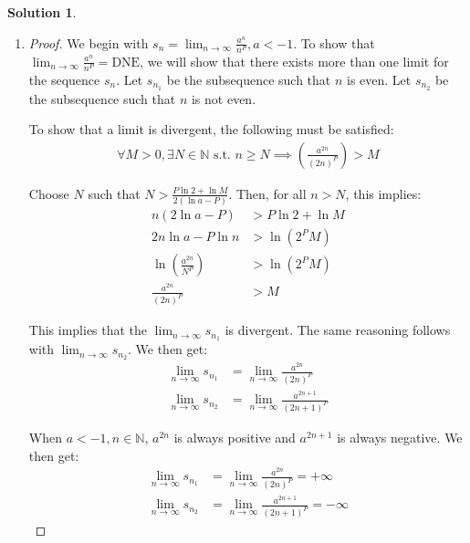 \documentclass[12pt]{article}
\theoremstyle{definition} %
\newtheorem{solution}{Solution}
\theoremstyle{plain} %
\begin{document}
\begin{solution}
\begin{enumerate}
\begin{proof}
        The $\lim_{n \to \infty} \left| \frac{s_{n+1}}{s_n} \right|$ exists, so Problem 1 applies. According to the result from Problem 1a, if $\lim_{n \to \infty} \left| \frac{s_{n+1}}{s_n} \right| > 1$, then $\lim_{n \to \infty} s_n = +\infty$. When $a > 1$, $\lim_{n \to \infty} \frac{a^n}{n^P} = a$. Therefore, its limit must be $+\infty$ when $a > 1$, as desired. $\qed$
    \end{proof}
    \item \begin{proof}
        We begin with $s_n = \lim_{n \to \infty} \frac{a^n}{n^P}, a < -1$. To show that $\lim_{n \to \infty} \frac{a^n}{n^P} = \text{DNE}$, we will show that there exists more than one limit for the sequence $s_n$. Let $s_{n_1}$ be the subsequence such that $n$ is even. Let $s_{n_2}$ be the subsequence such that $n$ is not even. 
    
        To show that a limit is divergent, the following must be satisfied: 
        \begin{align}
        \forall M > 0, \exists N \in \mathbb{N} \text{ s.t. } n \geq N \implies \left( \frac{a^{2n}}{(2n)^P} \right) > M \tag{23}
        \end{align}
    
        Choose $N$ such that $N > \frac{P \ln 2 + \ln M}{2 (\ln a - P)}$. Then, for all $n > N$, this implies:
        \begin{align}
            n(2 \ln a - P) &> P \ln 2 + \ln M \tag{24} \\
            2n \ln a - P \ln n &> \ln (2^P M) \tag{25} \\
            \ln \left( \frac{a^{2n}}{N^P} \right) &> \ln (2^P M) \tag{26} \\
            \frac{a^{2n}}{(2n)^P} &> M \tag{27}
        \end{align}
    
        This implies that the $\lim_{n \to \infty} s_{n_1}$ is divergent. The same reasoning follows with $\lim_{n \to \infty} s_{n_2}$. We then get:
        \begin{align}
            \lim_{n \to \infty} s_{n_1} &= \lim_{n \to \infty} \frac{a^{2n}}{(2n)^P} \tag{28} \\
            \lim_{n \to \infty} s_{n_2} &= \lim_{n \to \infty} \frac{a^{2n+1}}{(2n+1)^P} \tag{29}
        \end{align}
    
        When $a < -1, n \in \mathbb{N}$, $a^{2n}$ is always positive and $a^{2n+1}$ is always negative. We then get:
        \begin{align}
            \lim_{n \to \infty} s_{n_1} &= \lim_{n \to \infty} \frac{a^{2n}}{(2n)^P} = +\infty \tag{31} \\
            \lim_{n \to \infty} s_{n_2} &= \lim_{n \to \infty} \frac{a^{2n+1}}{(2n+1)^P} = -\infty \tag{32}
        \end{align}
    

\end{proof}
\end{enumerate}
\end{solution}
\end{document}
